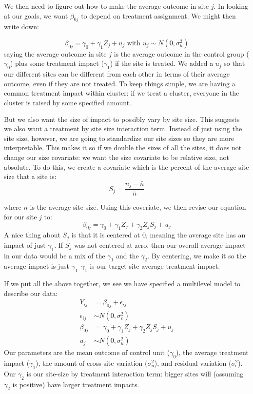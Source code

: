 \documentclass[
]{book}
\begin{document}
We then need to figure out how to make the average outcome in site \(j\).
In looking at our goals, we want \(\beta_{0j}\) to depend on treatment assignment.
We might then write down:

\[ \beta_{0j} = \gamma_0 + \gamma_1 Z_j + u_j \mbox{ with } u_j \sim N( 0, \sigma^2_u )\]
saying the average outcome in site \(j\) is the average outcome in the control group (\(\gamma_0\)) plus some treatment impact (\(\gamma_1\)) if the site is treated.
We added a \(u_j\) so that our different sites can be different from each other in terms of their average outcome, even if they are not treated.
To keep things simple, we are having a common treatment impact within cluster: if we treat a cluster, everyone in the cluster is raised by some specified amount.

But we also want the size of impact to possibly vary by site size.
This suggests we also want a treatment by site size interaction term.
Instead of just using the site size, however, we are going to standardize our site sizes so they are more interpretable.
This makes it so if we double the sizes of all the sites, it does not change our size covariate: we want the size covariate to be relative size, not absolute.
To do this, we create a covariate which is the percent of the average site size that a site is:
\[ S_j = \frac{n_j - \bar{n}}{ \bar{n} } \]

where \(\bar{n}\) is the average site size. Using this coveriate, we then revise our equation for our site \(j\) to:
\[ \beta_{0j} = \gamma_{0} + \gamma_{1} Z_j + \gamma_2 Z_j S_j + u_j \]
A nice thing about \(S_j\) is that it is centered at 0, meaning the average site has an impact of just \(\gamma_1\).
If \(S_j\) was not centered at zero, then our overall average impact in our data would be a mix of the \(\gamma_1\) and the \(\gamma_2\).
By centering, we make it so the average impact is just \(\gamma_1\)--\(\gamma_1\) is our target site average treatment impact.

If we put all the above together, we see we have specified a multilevel model to describe our data:
\[
\begin{aligned}
Y_{ij} &= \beta_{0j} + \epsilon_{ij} \\
\epsilon_{ij} &\sim N( 0, \sigma^2_\epsilon ) \\
\beta_{0j} &= \gamma_{0} + \gamma_{1} Z_j + \gamma_2 Z_j S_j + u_j \\
u_j &\sim N( 0, \sigma^2_u )
\end{aligned}
\]
Our parameters are the mean outcome of control unit (\(\gamma_0\)), the average treatment impact (\(\gamma_1\)), the amount of cross site variation (\(\sigma^2_u\)), and residual variation (\(\sigma^2_\epsilon\)).
Our \(\gamma_2\) is our site-size by treatment interaction term: bigger sites will (assuming \(\gamma_2\) is positive) have larger treatment impacts.
\end{document}
